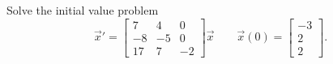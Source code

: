 \documentclass{ximera}
\begin{document}
\begin{exercise}
    Solve the initial value problem
    \[ 
        {\vec{x}}' = 
        \begin{bmatrix} 
            7 & 4 & 0 \\ 
            -8 & -5 & 0 \\ 
            17 & 7 & -2 
        \end{bmatrix} 
        \vec{x} \qquad \vec{x}(0) = 
        \begin{bmatrix} 
            -3 \\ 
            2 \\ 
            2 
        \end{bmatrix}. 
    \]
\end{exercise}
\end{document}

